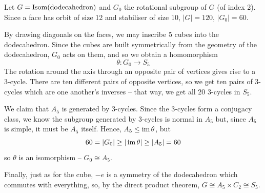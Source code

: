 \documentclass{../template/note}
\begin{document}
    \begin{example}
        Let \(G = \operatorname{Isom}(\text{dodecahedron})\) and \(G_0\) the rotational subgroup of \(G\) (of index 2). Since a face has orbit of size 12 and stabiliser of size 10, \(|G| = 120\), \(|G_0| = 60\).

        By drawing diagonals on the faces, we may inscribe 5 cubes into the dodecahedron. Since the cubes are built symmetrically from the geometry of the dodecahedron, \(G_0\) acts on them, and so we obtain a homomorphism
        \[  
            \theta: G_0 \to S_5
        \]
        The rotation around the axis through an opposite pair of vertices gives rise to a 3-cycle. There are ten different pairs of opposite vertices, so we get ten pairs of 3-cycles which are one another's inverses -- that way, we get all 20 3-cycles in \(S_5\).

        We claim that \(A_5\) is generated by 3-cycles. Since the 3-cycles form a conjugacy class, we know the subgroup generated by 3-cycles is normal in \(A_5\) but, since \(A_5\) is simple, it must be \(A_5\) itself. Hence, \(A_5 \leq \operatorname{im} \theta\), but
        \[
            60 = |G_0| \geq |\operatorname{im} \theta| \geq |A_5| = 60
        \]
        so \(\theta\) is an isomorphism -- \(G_0 \cong A_5\).

        Finally, just as for the cube, \(-e\) is a symmetry of the dodecahedron which commutes with everything, so, by the direct product theorem, \(G \cong A_5 \times C_2 \cong S_5\).
    \end{example}
    
    
    
    
\end{document}
